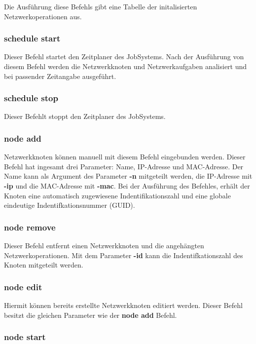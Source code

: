 \documentclass[12pt,a4paper]{report}
\begin{document}
\begin{onehalfspace}
Die Ausführung diese Befehls gibt eine Tabelle der initalisierten Netzwerkoperationen aus.

\subsubsection{schedule start}

Dieser Befehl startet den Zeitplaner des JobSystems. Nach der Ausführung von diesem Befehl werden die Netzwerkknoten und Netzwerkaufgaben analisiert und bei passender Zeitangabe ausgeführt.

\subsubsection{schedule stop}

Dieser Befehlt stoppt den Zeitplaner des JobSystems.

\subsubsection{node add}

Netzwerkknoten können manuell mit diesem Befehl eingebunden werden. Dieser Befehl hat ingesamt drei Parameter: Name, IP-Adresse und MAC-Adresse. Der Name kann als Argument des Parameter \textbf{-n} mitgeteilt werden, die IP-Adresse mit \textbf{-ip} und die MAC-Adresse mit \textbf{-mac}. Bei der Ausführung des Befehles, erhält der Knoten eine automatisch zugewiesene Indentifikationszahl und eine globale eindeutige Indentifkationsnummer (GUID).

\subsubsection{node remove}

Dieser Befehl entfernt einen Netzwerkknoten und die angehängten Netzwerkoperationen. Mit dem Parameter \textbf{-id} kann die Indentifkationszahl des Knoten mitgeteilt werden.

\subsubsection{node edit}

Hiermit können bereits erstellte Netzwerkknoten editiert werden. Dieser Befehl besitzt die gleichen Parameter wie der \textbf{node add} Befehl.

\subsubsection{node start}


\end{onehalfspace}
\end{document}

